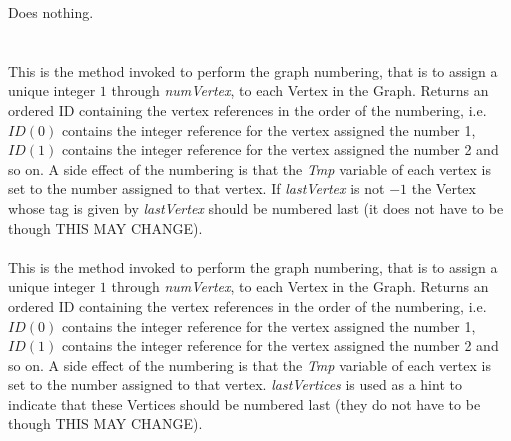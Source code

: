 Does nothing. \\

  \\
\\
This is the method invoked to perform the graph numbering, that is to
assign a unique integer $1$ through {\em numVertex}, to each Vertex in
the Graph. Returns an ordered ID containing the vertex references in the order
of the numbering, i.e. $ID(0)$ contains the integer reference for the
vertex assigned the number 1, $ID(1)$ contains the integer reference for the
vertex assigned the number 2 and so on. A side effect of the numbering
is that the {\em Tmp} variable of each vertex is set to the number
assigned to that vertex. If {\em lastVertex} is not $-1$ the Vertex
whose tag is given by {\em lastVertex} should be numbered last (it
does not have to be though THIS MAY CHANGE).\\

\\
This is the method invoked to perform the graph numbering, that is to
assign a unique integer $1$ through {\em numVertex}, to each Vertex in
the Graph. Returns an ordered ID containing the vertex references in the order
of the numbering, i.e. $ID(0)$ contains the integer reference for the
vertex assigned the number 1, $ID(1)$ contains the integer reference for the
vertex assigned the number 2 and so on. A side effect of the numbering
is that the {\em Tmp} variable of each vertex is set to the number
assigned to that vertex. {\em lastVertices} is used as a hint to
indicate that these Vertices should be numbered last (they do not have
to be though THIS MAY CHANGE).






